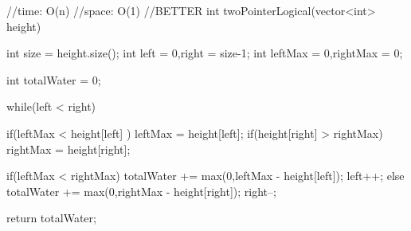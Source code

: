 \begin{solution}
    
    \begin{code}
//time: O(n)
//space: O(1) 
//BETTER
int twoPointerLogical(vector<int> height)
{
    int size = height.size();
    int left = 0,right = size-1;
    int leftMax = 0,rightMax = 0;
    
    int totalWater = 0;
    
    while(left < right)
    {
        if(leftMax < height[left] ) leftMax = height[left];
        if(height[right] > rightMax) rightMax = height[right];
        
        if(leftMax < rightMax)
        {
            totalWater += max(0,leftMax - height[left]);
            left++;
        }
        else
        {
            totalWater += max(0,rightMax - height[right]);
            right--;
        }
    }
    
    return totalWater; 
}
    \end{code}
\end{solution}
